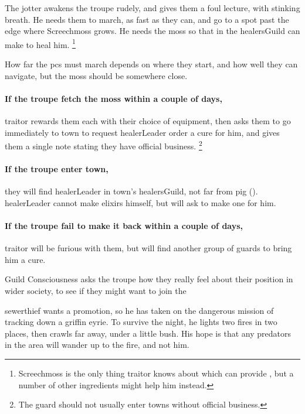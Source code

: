 \noindent
The \gls{jotter} awakens the troupe rudely, and gives them a foul lecture, with stinking breath.
He needs them to march, as fast as they can, and go to a spot past the \gls{edge} where Screechmoss%
grows.
He needs the moss so that  in the \gls{healersGuild} can make  to heal him.%
\footnote{Screechmoss is the only thing \gls{traitor} knows about which can provide , but a number of other \glspl{ingredient} might help him instead.}

How far the \glspl{pc} must march depends on where they start, and how well they can navigate,%
but the moss should be somewhere close.

\paragraph{If the troupe fetch the moss within a couple of days,}
\gls{traitor} rewards them each with their choice of equipment, then asks them to go immediately to \gls{town} to request \gls{healerLeader} order a cure for him, and gives them a single note stating they have official business.%
\footnote{The \gls{guard} should not usually enter towns without official business.}

\paragraph{If the troupe enter \gls{town},}
they will find \gls{healerLeader} in \gls{town}'s \gls{healersGuild}, not far from \gls{pig} ().
\gls{healerLeader} cannot make \glspl{elixir} himself, but will ask  to make one for him.

\paragraph{If the troupe fail to make it back within a couple of days,}
\gls{traitor} will be furious with them, but will find another group of \glspl{guard} to bring him a cure.

{Guild Consciousness}%
{ asks the troupe how they really feel about their position in wider society, to see if they might want to join the }%

\Gls{sewerthief} wants a promotion, so he has taken on the dangerous mission of tracking down a griffin eyrie.
To survive the night, he lights two fires in two places, then crawls far away, under a little bush.
His hope is that any predators in the area will wander up to the fire, and not him.

